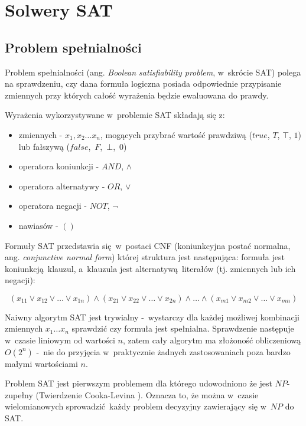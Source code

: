 \chapter{Solwery SAT}
\label{chp:sat-theory}
\section{Problem spełnialności}
Problem spełnialności (ang. \textit{Boolean satisfiability problem}, w~skrócie SAT) polega na sprawdzeniu, czy dana formuła logiczna
posiada odpowiednie przypisanie zmiennych przy których całość wyrażenia będzie ewaluowana do prawdy.

Wyrażenia wykorzystywane w~problemie SAT składają się z: 
\begin{itemize}
    \item zmiennych - $x_1, x_2 \dots x_n$, mogących przybrać wartość prawdziwą ($true$, $T$, $\top$, $1$) 
    lub fałszywą ($false$,~$F$,~$\bot$,~$0$)
    \item operatora koniunkcji - $AND$, $\land$
    \item operatora alternatywy - $OR$, $\lor$
    \item operatora negacji - $NOT$, $\lnot$
    \item nawiasów - $()$
\end{itemize}

Formuły SAT przedstawia się w~postaci CNF (koniunkcyjna postać normalna, ang. \textit{conjunctive normal form}) 
której struktura jest następująca: formuła jest koniunkcją klauzul, a~klauzula jest alternatywą literałów (tj. zmiennych lub ich negacji):

\[ (x_{11} \lor x_{12} \lor \dots \lor x_{1n} ) \land (x_{21} \lor x_{22} \lor \dots \lor x_{2n} ) \land  \dots \land (x_{m1} \lor x_{m2} \lor \dots \lor x_{mn} ) \]


Naiwny algorytm SAT jest trywialny -~wystarczy dla każdej możliwej kombinacji zmiennych $x_1 \dots x_n$
sprawdzić czy formuła jest spełnialna. Sprawdzenie następuje w~czasie liniowym od wartości $n$, zatem cały algorytm
ma złożoność obliczeniową $O(2^n)$ -~nie do przyjęcia w~praktycznie żadnych zastosowaniach poza bardzo małymi wartościami $n$.

Problem SAT jest pierwszym problemem dla którego udowodniono że jest $NP$-zupełny (Twierdzenie Cooka-Levina \cite{cook-SAT, levin-SAT}).
Oznacza to, że można w~czasie wielomianowych sprowadzić każdy problem decyzyjny zawierający się w~$NP$ do SAT.

